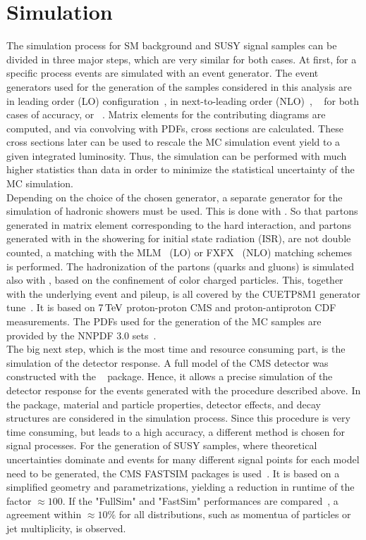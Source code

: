 \section{Simulation}\label{sec:Simulation}
The simulation process for SM background and SUSY signal samples can be divided in three major steps, which are very similar for both cases. At first, for a specific process events are simulated with an event generator. The event generators used for the generation of the samples considered in this analysis are  in leading order (LO) configuration~\cite{Madgraph1,Madgraph2,Madgraph3}, \MADANDMC in next-to-leading order (NLO)~\cite{Madgraph1,AMCATNLO}, \PYTHIA~\cite{Pythia} for both cases of accuracy, or \POWHEG~\cite{Powheg1,Powheg2}. Matrix elements for the contributing diagrams are computed, and via convolving with PDFs, cross sections are calculated. These cross sections later can be used to rescale the MC simulation event yield to a given integrated luminosity. Thus, the simulation can be performed with much higher statistics than data in order to minimize the statistical uncertainty of the MC simulation.\\
Depending on the choice of the chosen generator, a separate generator for the simulation of hadronic showers must be used. This is done with \PYTHIA. So that partons generated in matrix element corresponding to the hard interaction, and partons generated with \PYTHIA in the showering for \eg initial state radiation (ISR), are not double counted, a matching with the \textsc{MLM}~\cite{Madgraph2} (LO) or \textsc{FXFX}~\cite{AMCATNLO} (NLO) matching schemes is performed. The hadronization of the partons (quarks and gluons) is simulated also with \PYTHIA, based on the confinement of color charged particles.  This, together with the underlying event and pileup, is all covered by the \textsc{CUETP8M1} generator tune~\cite{Tune}. It is based on $7\,\text{Te\hspace{-.08em}V}$ proton-proton CMS and proton-antiproton CDF measurements. The PDFs used for the generation of the MC samples are provided by the \textsc{NNPDF} 3.0 sets~\cite{NNPDF}.\\
The big next step, which is the most time and resource consuming part, is the simulation of the detector response. A full model of the CMS detector was constructed with the \GEANTfour~\cite{Geant} package. Hence, it allows a precise simulation of the detector response for the events generated with the procedure described above. In the \GEANTfour package, material and particle properties, detector effects, and decay structures are considered in the simulation process. Since this procedure is very time consuming, but leads to a high accuracy, a different method is chosen for signal processes. For the generation of SUSY samples, where theoretical uncertainties dominate and events for many different signal points for each model need to be generated, the CMS \textsc{FASTSIM} packages is used~\cite{FastSim}. It is based on a simplified geometry and parametrizations, yielding a reduction in runtime of the factor $\approx100$. If the "FullSim" and "FastSim" performances are compared~\cite{FastSimQuality}, a agreement within $\approx10\%$ for all distributions, such as momentua of particles or jet multiplicity, is observed.\\
